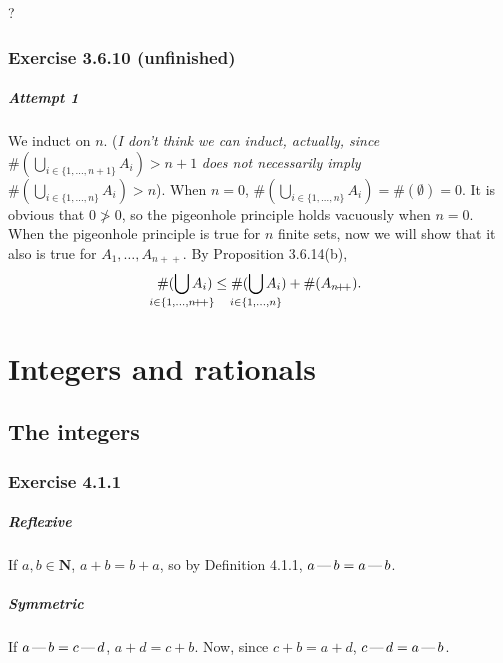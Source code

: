 \documentclass[12pt, oneside]{book}
\newcommand{\increment}{\! + \! +}
\newcommand{\formalminus}{\, \text{\textemdash} \,}
\begin{document}
	?
	
	\subsection*{Exercise 3.6.10 (unfinished)}
	
	\paragraph*{Attempt 1}
	
	We induct on $n$. (\emph{I don't think we can induct, actually, since} $\#(\bigcup_{i \in \{1, \dotsc, n + 1\}} A_i) > n + 1$ \emph{does not necessarily imply} $\#(\bigcup_{i \in \{1, \dotsc, n\}} A_i) > n$). When $n = 0$, $\#(\bigcup_{i \in \{1, \dotsc, n\}} A_i) = \#(\emptyset) = 0$. It is obvious that $0 \not > 0$, so the pigeonhole principle holds vacuously when $n = 0$. When the pigeonhole principle is true for $n$ finite sets, now we will show that it also is true for $A_1, \dotsc, A_{n \increment}$. By Proposition 3.6.14(b), \[\#(\smashoperator{\bigcup_{i \in \{1, \dotsc, n \increment\}}} A_i) \le \#(\smashoperator{\bigcup_{i \in \{1, \dotsc, n\}}} A_i) + \#(A_{n \increment}).\]
	
	\chapter{Integers and rationals}
	
	\section{The integers}
	
	\subsection*{Exercise 4.1.1}
	
	\paragraph*{Reflexive}
	
	If $a, b \in \mathbf{N}$, $a + b = b + a$, so by Definition 4.1.1, $a \formalminus b = a \formalminus b$.
	
	\paragraph*{Symmetric}
	
	If $a \formalminus b = c \formalminus d$, $a + d = c + b$. Now, since $c + b = a + d$, $c \formalminus d = a \formalminus b$.
	
\end{document}
